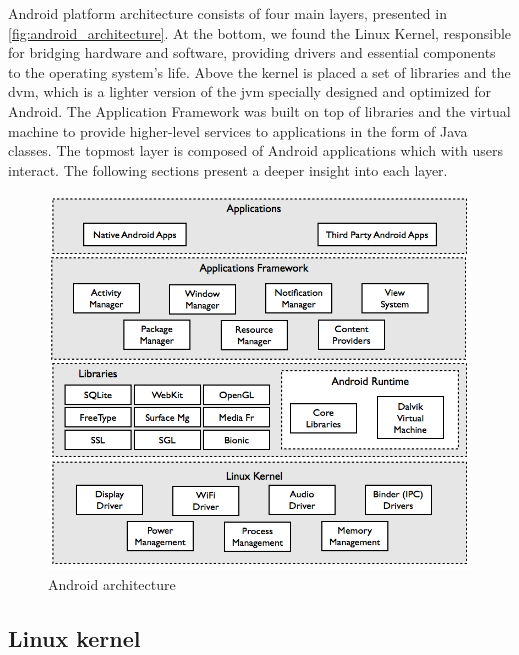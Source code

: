 Android platform architecture consists of four main layers, presented in \autoref{fig:android_architecture}. At the bottom, we found the Linux Kernel, responsible for bridging hardware and software, providing drivers and essential components to the operating system's life. Above the kernel is placed a set of libraries and the \gls{dvm}, which is a lighter version of the \gls{jvm} specially designed and optimized for Android. The Application Framework was built on top of libraries and the virtual machine to provide higher-level services to applications in the form of Java classes. The topmost layer is composed of Android applications which with users interact. The following sections present a deeper insight into each layer.

\begin{figure}[h]
 \begin{center}
 \includegraphics[scale=0.5]{figures/android_arch.png}
 \end{center}
 \caption{Android architecture}
 \label{fig:android_architecture}
\end{figure}

\subsection{Linux kernel}

